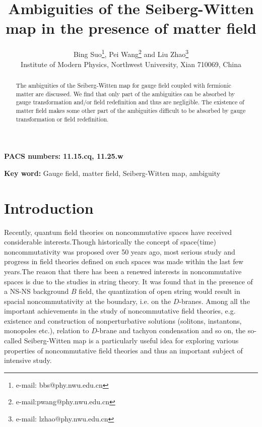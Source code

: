 \documentclass[a4paper,a4paper]{article}%
\begin{document}
\title{Ambiguities of the Seiberg-Witten map in the presence of matter field}
\author{Bing Suo\thanks{e-mail: bbs@phy.nwu.edu.cn},
Pei Wang\thanks{e-mail:pwang@phy.nwu.edu.cn} { } and
Liu Zhao\thanks{e-mail: lzhao@phy.nwu.edu.cn}
\\Institute of Modern Physics, Northwest University, Xian 710069, China}
\date{}
\maketitle

\begin{abstract}
The ambiguities of the Seiberg-Witten map for gauge field coupled with fermionic
matter are discussed. We find that only part of the ambiguities can be
absorbed by gauge transformation and/or field redefinition and thus are negligible.
The existence of matter field makes some other part of the ambiguities difficult
to be absorbed by gauge transformation or field redefinition.

\end{abstract}

\textbf{PACS numbers: 11.15.cq, 11.25.w}

\textbf{Key word:} Gauge field, matter field, Seiberg-Witten map, ambiguity

\section{Introduction}

Recently, quantum field theories on noncommutative spaces have received
considerable interests.Though historically the concept of space(time)
noncommutativity was proposed over 50 years ago\cite{1}, most serious study
and progress in field theories defined on such spaces was made within the last
few years\cite{2,3,4}.The reason that there has been a renewed interests in
noncommutative spaces is due to the studies in string theory\cite{5,6}. It was
found that in the presence of a NS-NS background $B$ field, the quantization
of open string would result in spacial noncommutativity at the boundary, i.e.
on the $D$-branes. Among all the important achievements in the study of
noncommutative field theories, e.g. existence and construction of
nonperturbative solutions (solitons, instantons, monopoles etc.), relation to
$D$-brane and tachyon condensation and so on, the so-called Seiberg-Witten
map\cite{6} is a particularly useful idea for exploring various properties of
noncommutative field theories and thus an important subject of intensive study.
\end{document}
